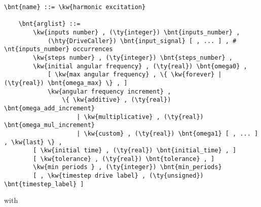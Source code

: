 \begin{Verbatim}[commandchars=\\\{\}]
    \bnt{name} ::= \kw{harmonic excitation}

    \bnt{arglist} ::=
        \kw{inputs number} , (\ty{integer}) \bnt{inputs_number} ,
            (\hty{DriveCaller}) \bnt{input_signal} [ , ... ] , # \nt{inputs_number} occurrences
        \kw{steps number} , (\ty{integer}) \bnt{steps_number} ,
        \kw{initial angular frequency} , (\ty{real}) \bnt{omega0} ,
            [ \kw{max angular frequency} , \{ \kw{forever} | (\ty{real}) \bnt{omega_max} \} , ]
            \kw{angular frequency increment} ,
                \{ \kw{additive} , (\ty{real}) \bnt{omega_add_increment}
                    | \kw{multiplicative} , (\ty{real}) \bnt{omega_mul_increment}
                    | \kw{custom} , (\ty{real}) \bnt{omega1} [ , ... ] , \kw{last} \} ,
        [ \kw{initial time} , (\ty{real}) \bnt{initial_time} , ]
        [ \kw{tolerance} , (\ty{real}) \bnt{tolerance} , ]
        \kw{min periods } , (\ty{integer}) \bnt{min_periods}
        [ , \kw{timestep drive label} , (\ty{unsigned}) \bnt{timestep_label} ]
\end{Verbatim}
with
